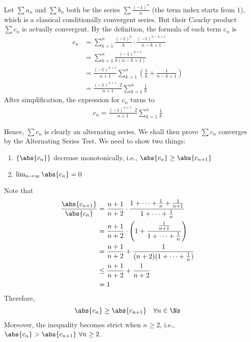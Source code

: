 \documentclass[thmcnt=section, 12pt]{elegantbook}
\begin{document}
\begin{example} \label{eg:2} %
    Let $\sum a_n$ and $\sum b_n$ both be the series $\sum \frac{(-1)^n}{n}$ (the term index starts from $1$), which is a classical conditionally convergent series. But their Cauchy product $\sum c_n$ is actually convergent. By the definition, the formula of each term $c_n$ is 
    \begin{align*}
        c_n &= \sum_{k=1}^n \frac{(-1)^k}{k} \cdot \frac{(-1)^{n-k+1}}{n-k+1} \\
        &= \sum_{k=1}^n \frac{(-1)^{n+1}}{k(n-k+1)} \\ 
        &= \frac{(-1)^{n+1}}{n+1} \sum_{k=1}^n \left( \frac{1}{k} + \frac{1}{n-k+1} \right) \\ 
        &= \frac{(-1)^{n+1} \cdot 2}{n+1} \sum_{k=1}^n \frac{1}{k}
    \end{align*}
    After simplification, the expression for $c_n$ turns to 
    \begin{align*}
        c_n = \frac{(-1)^{n+1} \cdot 2}{n+1} \sum_{k=1}^n \frac{1}{k}
    \end{align*}
    
    \par Hence, $\sum c_n$ is clearly an alternating series. We shall then prove $\sum c_n$ converges by the Alternating Series Test. We need to show two things:
    \begin{enumerate}
        \item $\left\{\abs{c_n}\right\}$ decrease monotonically, i.e., $\abs{c_n} \geq \abs{c_{n+1}}$
        \item $\lim_{n \to \infty} \abs{c_n} = 0$
    \end{enumerate}
    
    \par Note that 
    \begin{align*}
        \frac{\abs{c_{n+1}}}{\abs{c_n}}
        &= \frac{n+1}{n+2} \cdot \frac{1 + \cdots + \frac{1}{n} + \frac{1}{n+1}}{1 + \cdots + \frac{1}{n}} \\ 
        &= \frac{n+1}{n+2} \cdot \left( 1 + \frac{\frac{1}{n+1}}{1 + \cdots + \frac{1}{n}} \right) \\ 
        &= \frac{n+1}{n+2} + \frac{1}{(n+2) (1 + \cdots + \frac{1}{n})} \\ 
        &\leq \frac{n+1}{n+2} + \frac{1}{n+2} \\
        &= 1
    \end{align*}
    Therefore, 
    \begin{align*}
        \abs{c_n} \geq \abs{c_{n+1}} \quad \forall n \in \Ns
    \end{align*}
    Moreover, the inequality becomes strict when $n \geq 2$, i.e., $\abs{c_n} > \abs{c_{n+1}} \ \forall n \geq 2$.


\end{example}
\end{document}
